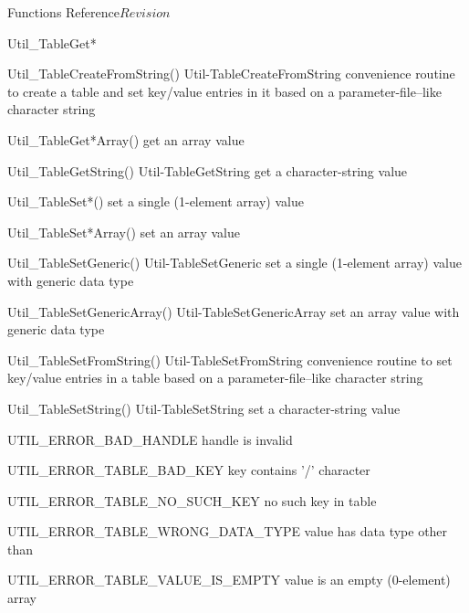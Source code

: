 \begin{cactuspart}{ Functions Reference}{}{$Revision$}
\begin{FunctionDescription}{Util\_TableGet*}
\begin{SeeAlsoSection}
\begin{SeeAlso2} {Util\_TableCreateFromString()} {Util-TableCreateFromString}
convenience routine to create a table and set key/value entries
in it based on a parameter-file--like character string
\end{SeeAlso2}
\begin{SeeAlso}{Util\_TableGet*Array()}
get an array value
\end{SeeAlso}
\begin{SeeAlso2} {Util\_TableGetString()} {Util-TableGetString}
get a character-string value
\end{SeeAlso2}
\begin{SeeAlso}{Util\_TableSet*()}
set a single (1-element array) value
\end{SeeAlso}
\begin{SeeAlso}{Util\_TableSet*Array()}
set an array value
\end{SeeAlso}
\begin{SeeAlso2} {Util\_TableSetGeneric()} {Util-TableSetGeneric}
set a single (1-element array) value with generic data type
\end{SeeAlso2}
\begin{SeeAlso2} {Util\_TableSetGenericArray()} {Util-TableSetGenericArray}
set an array value with generic data type
\end{SeeAlso2}
\begin{SeeAlso2} {Util\_TableSetFromString()} {Util-TableSetFromString}
convenience routine to set key/value entries in a table based on a
parameter-file--like character string
\end{SeeAlso2}
\begin{SeeAlso2} {Util\_TableSetString()} {Util-TableSetString}
set a character-string value
\end{SeeAlso2}
\end{SeeAlsoSection}

\begin{ErrorSection}
\begin{Error}{UTIL\_ERROR\_BAD\_HANDLE}
handle is invalid
\end{Error}
\begin{Error}{UTIL\_ERROR\_TABLE\_BAD\_KEY}
key contains '/' character
\end{Error}
\begin{Error}{UTIL\_ERROR\_TABLE\_NO\_SUCH\_KEY}
no such key in table
\end{Error}
\begin{Error}{UTIL\_ERROR\_TABLE\_WRONG\_DATA\_TYPE}
value has data type other than 
\end{Error}
\begin{Error}{UTIL\_ERROR\_TABLE\_VALUE\_IS\_EMPTY}
value is an empty (0-element) array
\end{Error}
\end{ErrorSection}


\end{FunctionDescription}
\end{cactuspart}
